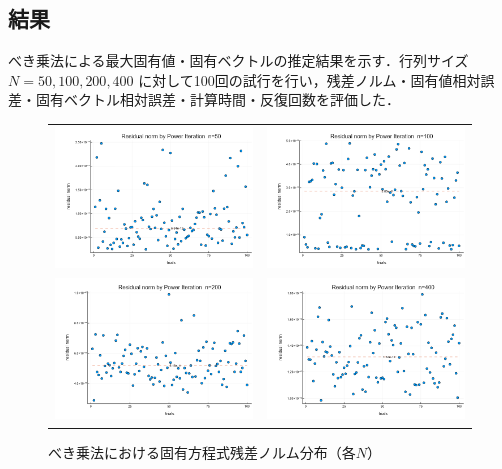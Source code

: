 \documentclass[a4paper,11pt]{ltjsarticle}
\begin{document}
\subsection{結果}
べき乗法による最大固有値・固有ベクトルの推定結果を示す．行列サイズ $N=50, 100, 200, 400$ に対して100回の試行を行い，残差ノルム・固有値相対誤差・固有ベクトル相対誤差・計算時間・反復回数を評価した．

\begin{figure}[H]
  \centering
  \begin{tabular}{cc}
    \includegraphics[width=72mm]{graphs/exp3_n50_residual.png} &
    \includegraphics[width=72mm]{graphs/exp3_n100_residual.png} \\
    \includegraphics[width=72mm]{graphs/exp3_n200_residual.png} &
    \includegraphics[width=72mm]{graphs/exp3_n400_residual.png} \\
  \end{tabular}
  \caption{べき乗法における固有方程式残差ノルム分布（各$N$）}
  \label{fig:exp3_residual}
\end{figure}
\end{document}

